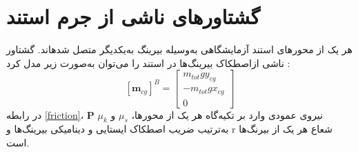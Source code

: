 \section{گشتاورهای ناشی از جرم استند}

هر یک از محورهای استند آزمایشگاهی به‌وسیله بیرینگ به‌یکدیگر متصل شدهاند. گشتاور ناشی ازاصطکاک بیرینگ‌ها در استند را می‌توان به‌صورت زیر مدل کرد
\cite{Arabolye}
:
\begin{equation}\label{friction}
	[\boldsymbol m_ {cg}]^B = \begin{bmatrix}
		m_{tot}gy_{cg} \\
		-m_{tot}gx_{cg} \\
		0
	\end{bmatrix}
\end{equation}
در رابطه \ref{friction}، $\boldsymbol P$ نیروی عمودی وارد بر تکیه‌گاه هر یک از محورها، $\mu_s$ و $\mu_k$ به‌ترتیب ضریب اصطکاک
ایستایی و دینامیکی بیرینگ‌ها و r شعاع هر یک از بیرنگ‌ها است.
